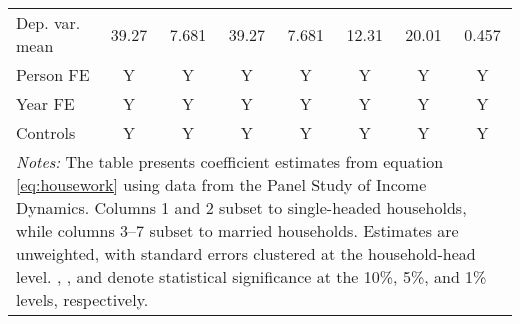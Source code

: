 {\begin{tabular}{l*{7}{c}}
Dep. var. mean      &       39.27         &       7.681         &       39.27         &       7.681         &       12.31         &       20.01         &       0.457         \\
Person FE           &           Y         &           Y         &           Y         &           Y         &           Y         &           Y         &           Y         \\
Year FE             &           Y         &           Y         &           Y         &           Y         &           Y         &           Y         &           Y         \\
Controls            &           Y         &           Y         &           Y         &           Y         &           Y         &           Y         &           Y         \\
\bottomrule
\multicolumn{8}{p{17cm}}{\footnotesize \textit{Notes:} The table presents coefficient estimates from equation \ref{eq:housework} using data from the Panel Study of Income Dynamics. Columns 1 and 2 subset to single-headed households, while columns 3--7 subset to married households. Estimates are unweighted, with standard errors clustered at the household-head level. \sym{*}, \sym{**}, and \sym{***} denote statistical significance at the 10\%, 5\%, and 1\% levels, respectively.}\\
\end{tabular}
}
